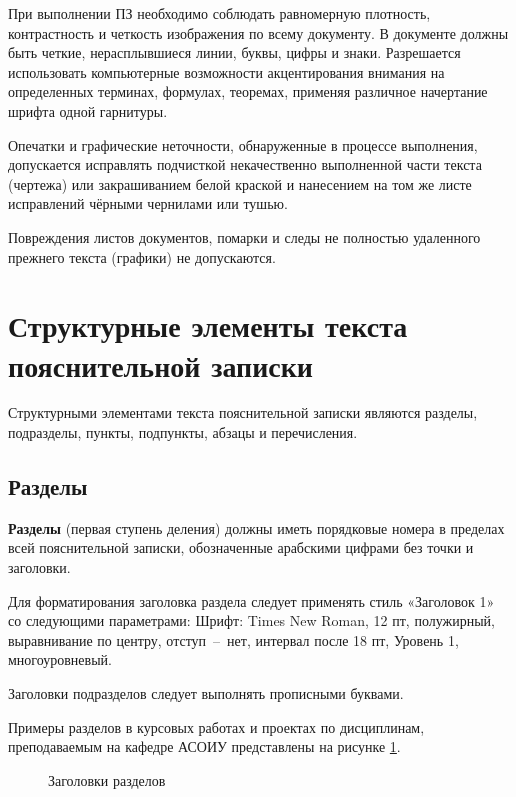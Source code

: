 При выполнении ПЗ необходимо соблюдать равномерную плотность, контрастность и
четкость изображения по всему документу. В документе должны быть четкие, нерасплывшиеся
линии, буквы, цифры и знаки. Разрешается использовать компьютерные возможности
акцентирования внимания на определенных терминах, формулах, теоремах, применяя
различное начертание шрифта одной гарнитуры.

Опечатки и графические неточности, обнаруженные в процессе выполнения, допускается
исправлять подчисткой некачественно выполненной части текста (чертежа) или закрашиванием
белой краской и нанесением на том же листе исправлений чёрными чернилами или тушью.

Повреждения листов документов, помарки и следы не полностью удаленного прежнего
текста (графики) не допускаются.

\section{Структурные элементы текста пояснительной записки}

Структурными элементами текста пояснительной записки являются разделы,
подразделы, пункты, подпункты, абзацы и перечисления.

\subsection{Разделы}

{\bf Разделы} (первая ступень деления) должны иметь порядковые номера в пределах всей
пояснительной записки, обозначенные арабскими цифрами без точки и заголовки.

Для форматирования заголовка раздела следует применять стиль «Заголовок 1» со
следующими параметрами: Шрифт: Times New Roman, 12 пт, полужирный, выравнивание по
центру, отступ~--~нет, интервал после 18 пт, Уровень 1, многоуровневый.

Заголовки подразделов следует выполнять прописными буквами.

Примеры разделов в курсовых работах и проектах по дисциплинам, преподаваемым на
кафедре АСОИУ представлены на рисунке \ref{headers}.

\begin{figure}[!ht]
	\label{headers}\caption{Заголовки разделов}
	\vspace{-16pt} %
	
\end{figure}

